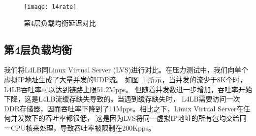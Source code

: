 \begin{figure}[htbp]
\centering
\texttt{[image: l4rate]}
\caption{第4层负载均衡延迟对比} \label{fig:l4rate}
\end{figure}
\subsection{第4层负载均衡}
我们将L4LB同Linux Virtual Server (LVS)进行对比。在压力测试中，我们向单个虚拟IP地址生成了大量并发的UDP流。
如图~\ref{fig:l4rate} 所示，当并发的流少于8K个时，L4LB吞吐率可以达到链路上限51.2Mpps。
但随着并发数进一步增加，吞吐率开始下降，这是L4LB流缓存缺失导致的。当遇到缓存缺失时，
L4LB需要访问一次DDR存储器，因而吞吐率下降到了11Mpps。相比之下，Linux Virtual Server在任何并发数下的吞吐率都很低，
这是因为LVS将同一虚拟IP地址的所有包均交给同一CPU核来处理，导致吞吐率被限制在200Kpps。
